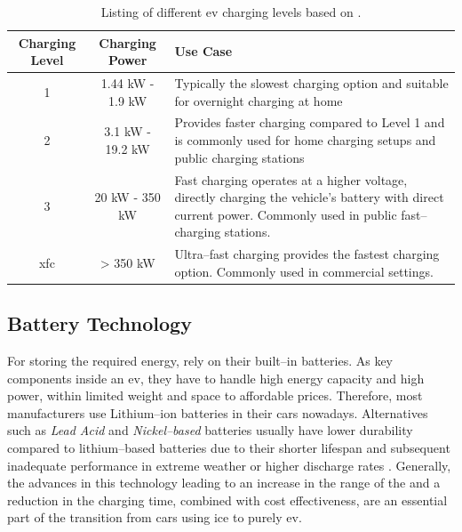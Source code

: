 \begingroup
\setlength{\tabcolsep}{10pt} %
\renewcommand{\arraystretch}{1.5} %
\begin{table}[h]
    \centering
    \caption{Listing of different \acrshort{ev} charging levels based on \cite{acharige_review_2023}.}
    \begin{tabular}{c|c|m{6.5cm}}
        Charging Level & Charging Power & Use Case \\ \hline
         1 & 1.44 kW - 1.9 kW & Typically the slowest charging option and suitable for overnight charging at home \\
         2 & 3.1 kW - 19.2 kW & Provides faster charging compared to Level 1 and is commonly used for home charging setups and public charging stations \\
         3 & 20 kW - 350 kW & Fast charging operates at a higher voltage, directly charging the vehicle's battery with direct current power. Commonly used in public fast--charging stations.\\
         \acrshort{xfc} & > 350 kW & Ultra--fast charging provides the fastest charging option. Commonly used in commercial settings.
    \end{tabular}
    \label{tab:ev-charging-levels}
\end{table}
\endgroup

\newpage

\subsection{Battery Technology}
\label{ch:Fundamentals:sec:Electric Mobility:ssec:Battery Technology}

For storing the required energy,  rely on their built--in batteries. As key components inside an \acrshort{ev}, they have to handle high energy capacity and high power, within limited weight and space to affordable prices.
Therefore, most manufacturers use Lithium--ion batteries in their cars nowadays. 
Alternatives such as \textit{Lead Acid} and \textit{Nickel--based} batteries usually have lower durability compared to lithium--based batteries due to their shorter lifespan and subsequent inadequate performance in extreme weather or higher discharge rates \cite{acharige_review_2023}.
Generally, the advances in this technology leading to an increase in the range of the  and a reduction in the charging time, combined with cost effectiveness, are an essential part of the transition from cars using \acrshort{ice} to purely \acrshort{ev}.

